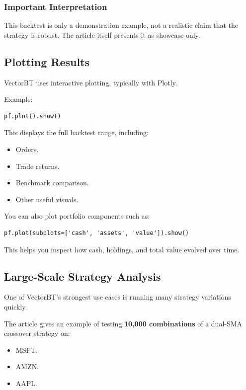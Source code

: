 \documentclass[12pt,openany]{book}
\begin{document}
\subsubsection{Important Interpretation}

This backtest is only a demonstration example, not a realistic claim that the strategy is robust. The article itself presents it as showcase-only.

\subsection{Plotting Results}

VectorBT uses interactive plotting, typically with Plotly.

Example:

\begin{Verbatim}[breaklines=true,breakanywhere=true,fontsize=\small]
pf.plot().show()
\end{Verbatim}

This displays the full backtest range, including:

\begin{itemize}[leftmargin=*]
    \item Orders.
    \item Trade returns.
    \item Benchmark comparison.
    \item Other useful visuals.
\end{itemize}

You can also plot portfolio components such as:

\begin{Verbatim}[breaklines=true,breakanywhere=true,fontsize=\small]
pf.plot(subplots=['cash', 'assets', 'value']).show()
\end{Verbatim}

This helps you inspect how cash, holdings, and total value evolved over time.

\subsection{Large-Scale Strategy Analysis}

One of VectorBT's strongest use cases is running many strategy variations quickly.

The article gives an example of testing \textbf{10,000 combinations} of a dual-SMA crossover strategy on:

\begin{itemize}[leftmargin=*]
    \item MSFT.
    \item AMZN.
    \item AAPL.
\end{itemize}
\end{document}
